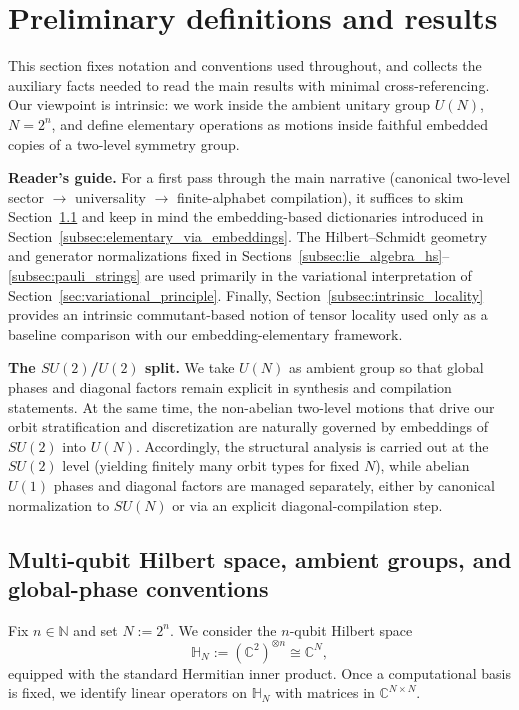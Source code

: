 \documentclass{article}%
\theoremstyle{definition}
\numberwithin{equation}{section}
\newcommand{\N}{\mathbb{N}}
\begin{document}
\section{Preliminary definitions and results}
\label{sec:preliminaries}

\noindent
This section fixes notation and conventions used throughout, and collects the auxiliary facts needed
to read the main results with minimal cross-referencing. Our viewpoint is intrinsic: we work inside
the ambient unitary group $U(N)$, $N=2^n$, and define elementary operations as motions inside faithful
embedded copies of a two-level symmetry group.

\smallskip
\noindent\textbf{Reader's guide.}
For a first pass through the main narrative (canonical two-level sector $\rightarrow$ universality
$\rightarrow$ finite-alphabet compilation), it suffices to skim
Section~\ref{subsec:hilbert_and_groups} and keep in mind the embedding-based dictionaries introduced in
Section~\ref{subsec:elementary_via_embeddings}. The Hilbert--Schmidt geometry and generator
normalizations fixed in Sections~\ref{subsec:lie_algebra_hs}--\ref{subsec:pauli_strings} are used
primarily in the variational interpretation of Section~\ref{sec:variational_principle}. Finally,
Section~\ref{subsec:intrinsic_locality} provides an intrinsic commutant-based notion of tensor
locality used only as a baseline comparison with our embedding-elementary framework.

\smallskip
\noindent\textbf{The $SU(2)$/$U(2)$ split.}
We take $U(N)$ as ambient group so that global phases and diagonal factors remain explicit in
synthesis and compilation statements. At the same time, the non-abelian two-level motions that drive
our orbit stratification and discretization are naturally governed by embeddings of $SU(2)$ into
$U(N)$. Accordingly, the structural analysis is carried out at the $SU(2)$ level (yielding finitely
many orbit types for fixed $N$), while abelian $U(1)$ phases and diagonal factors are managed
separately, either by canonical normalization to $SU(N)$ or via an explicit diagonal-compilation
step.


\subsection{Multi-qubit Hilbert space, ambient groups, and global-phase conventions}
\label{subsec:hilbert_and_groups}
Fix $n\in\N$ and set $N:=2^n$. We consider the $n$-qubit Hilbert space
\begin{equation}\label{eq:HN_def}
\mathbb{H}_N := (\mathbb{C}^2)^{\otimes n} \cong \mathbb{C}^{N},
\end{equation}
equipped with the standard Hermitian inner product. Once a computational basis is fixed, we identify
linear operators on $\mathbb{H}_N$ with matrices in $\mathbb{C}^{N\times N}$.
\end{document}
